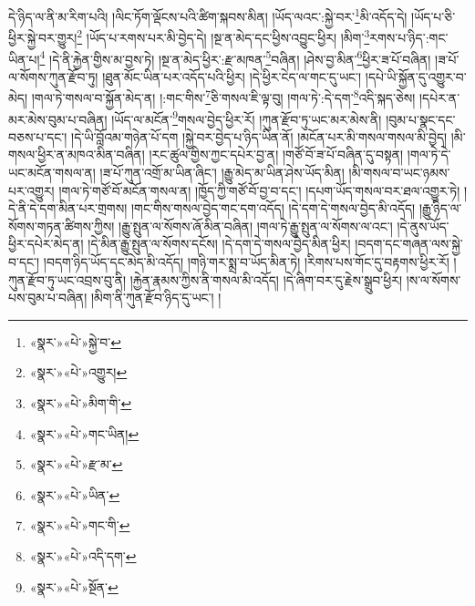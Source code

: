 དེ་ཉིད་ལ་ནི་མ་རིག་པའི། །ལིང་ཏོག་ལྡོངས་པའི་ཚིག་སྐབས་མིན། །ཡོད་ལའང་:སྐྱེ་བར་\footnote{«སྣར་»«པེ་»སྐྱེ་བ་}མི་འདོད་དེ། །ཡོད་པ་ཅི་ཕྱིར་སྐྱེ་བར་གྱུར།\footnote{«སྣར་»«པེ་»འགྱུར།} །ཡོད་པ་རགས་པར་མི་བྱེད་དེ། །སྔ་ན་མེད་དང་ཕྱིས་འབྱུང་ཕྱིར། །མིག་\footnote{«སྣར་»«པེ་»མིག་གི་}རགས་པ་ཉིད་:གང་ཡིན་པ།\footnote{«སྣར་»«པེ་»གང་ཡིན།} །དེ་ནི་རྐྱེན་གྱིས་མ་བྱས་ཏེ། །སྔ་ན་མེད་ཕྱིར་:རྫ་མཁན་\footnote{«སྣར་»«པེ་»རྫ་མ་}བཞིན། །ཤེས་བྱ་མིན་\footnote{«སྣར་»«པེ་»ཡིན་}ཕྱིར་ཟ་པོ་བཞིན། །ཟ་པོ་ལ་སོགས་ཀུན་རྫོབ་ཏུ། །ཐུན་མོང་ཡིན་པར་འདོད་པའི་ཕྱིར། །དེ་ཕྱིར་ངེད་ལ་གང་དུ་ཡང་། །དཔེ་ཡི་སྐྱོན་དུ་འགྱུར་བ་མེད། །གལ་ཏེ་གསལ་བ་སྐྱོན་མེད་ན། །:གང་གིས་\footnote{«སྣར་»«པེ་»གང་གི་}ཅི་གསལ་ཇི་ལྟ་བུ། །གལ་ཏེ་:དེ་དག་\footnote{«སྣར་»«པེ་»འདི་དག་}འདི་སྐད་ཅེས། །དཔེར་ན་མར་མེས་བུམ་པ་བཞིན། །ཡོད་ལ་མངོན་\footnote{«སྣར་»«པེ་»སྔོན་}གསལ་བྱེད་ཕྱིར་རོ། །ཀུན་རྫོབ་ཏུ་ཡང་མར་མེས་ནི། །བུམ་པ་སྣང་དང་བཅས་པ་དང་། །དེ་ཡི་བློའམ་གཉེན་པོ་དག །སྐྱེ་བར་བྱེད་པ་ཉིད་ཡིན་ནོ། །མངོན་པར་མི་གསལ་གསལ་མི་བྱེད། །མི་གསལ་ཕྱིར་ན་མཁའ་མིན་བཞིན། །རང་ཚུལ་གྱིས་ཀྱང་དཔེར་བྱ་ན། །གཙོ་བོ་ཟ་པོ་བཞིན་དུ་བསྟན། །གལ་ཏེ་དེ་ཡང་མངོན་གསལ་ན། །ཟ་པོ་ཀུན་འགྲོ་མ་ཡིན་ཞིང་། །རྒྱུ་མེད་མ་ཡིན་ཤེས་ཡོད་མིན། །མི་གསལ་བ་ཡང་ཉམས་པར་འགྱུར། །གལ་ཏེ་གཙོ་བོ་མངོན་གསལ་ན། །ཁྱོད་ཀྱི་གཙོ་བོ་བྱ་བ་དང་། །དཔག་ཡོད་གསལ་བར་ཐལ་འགྱུར་ཏེ། །དེ་ནི་དེ་དག་མིན་པར་གྲགས། །གང་གིས་གསལ་བྱེད་གང་དག་འདོད། །དེ་དག་དེ་གསལ་བྱེད་མི་འདོད། །རྒྱུ་ཉིད་ལ་སོགས་གཏན་ཚིགས་ཀྱིས། །རྒྱུ་སྤུན་ལ་སོགས་ཞོ་མིན་བཞིན། །གལ་ཏེ་རྒྱུ་སྤུན་ལ་སོགས་ལ་འང་། །དེ་ནུས་ཡོད་ཕྱིར་དཔེར་མེད་ན། །དེ་མིན་རྒྱུ་སྤུན་ལ་སོགས་དངོས། །དེ་དག་དེ་གསལ་བྱེད་མིན་ཕྱིར། །བདག་དང་གཞན་ལས་སྐྱེ་བ་དང་། །བདག་ཉིད་ཡོད་དང་མེད་མི་འདོད། །གཉི་གར་སྨྲ་བ་ཡོད་མིན་ཏེ། །རིགས་པས་གོང་དུ་བརྟགས་ཕྱིར་རོ། །ཀུན་རྫོབ་ཏུ་ཡང་འབྲས་བུ་ནི། །རྐྱེན་རྣམས་ཀྱིས་ནི་གསལ་མི་འདོད། །དེ་ཞིག་བར་དུ་རྗེས་སྒྲུབ་ཕྱིར། །ས་ལ་སོགས་པས་བུམ་པ་བཞིན། །མིག་ནི་ཀུན་རྫོབ་ཉིད་དུ་ཡང་། །
